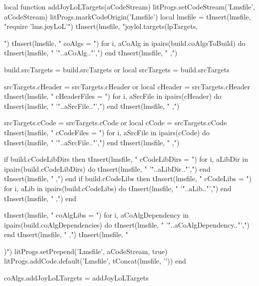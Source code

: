 \startLuaCode
local function addJoyLoLTargets(aCodeStream)
  litProgs.setCodeStream('Lmsfile', aCodeStream)
  litProgs.markCodeOrigin('Lmsfile')
  local lmsfile = {}
  tInsert(lmsfile, "require 'lms.joyLoL'\n")
  tInsert(lmsfile, "joylol.targets(lpTargets, {")
  tInsert(lmsfile, "  coAlgs = {")
  for i, aCoAlg in ipairs(build.coAlgsToBuild) do
    tInsert(lmsfile, "    '"..aCoAlg.."',")
  end
  tInsert(lmsfile, "  },")
  
  build.srcTargets = build.srcTargets or { }
  local srcTargets = build.srcTargets
  
  srcTargets.cHeader = srcTargets.cHeader or { }
  local cHeader      = srcTargets.cHeader
  tInsert(lmsfile, "  cHeaderFiles = {")
  for i, aSrcFile in ipairs(cHeader) do
    tInsert(lmsfile, "    '"..aSrcFile.."',")
  end
  tInsert(lmsfile, "  },")
  
  srcTargets.cCode = srcTargets.cCode or { }
  local cCode      = srcTargets.cCode
  tInsert(lmsfile, "  cCodeFiles = {")
  for i, aSrcFile in ipairs(cCode) do
    tInsert(lmsfile, "    '"..aSrcFile.."',")
  end
  tInsert(lmsfile, "  },")

  if build.cCodeLibDirs then 
    tInsert(lmsfile, "  cCodeLibDirs = {")
    for i, aLibDir in ipairs(build.cCodeLibDirs) do
      tInsert(lmsfile, "    '"..aLibDir.."',")
    end
    tInsert(lmsfile, "  },")
  end
  if build.cCodeLibs then 
    tInsert(lmsfile, "  cCodeLibs = {")
    for i, aLib in ipairs(build.cCodeLibs) do
      tInsert(lmsfile, "    '"..aLib.."',")
    end
    tInsert(lmsfile, "  },")
  end

  tInsert(lmsfile, "  coAlgLibs = {")
  for i, aCoAlgDependency in ipairs(build.coAlgDependencies) do
    tInsert(lmsfile, "    '"..aCoAlgDependency.."',")
  end
  tInsert(lmsfile, "  },")
  tInsert(lmsfile, "})")
  litProgs.setPrepend('Lmsfile', aCodeStream, true)
  litProgs.addCode.default('Lmsfile', tConcat(lmsfile, '\n'))
end

coAlgs.addJoyLoLTargets = addJoyLoLTargets
\stopLuaCode
